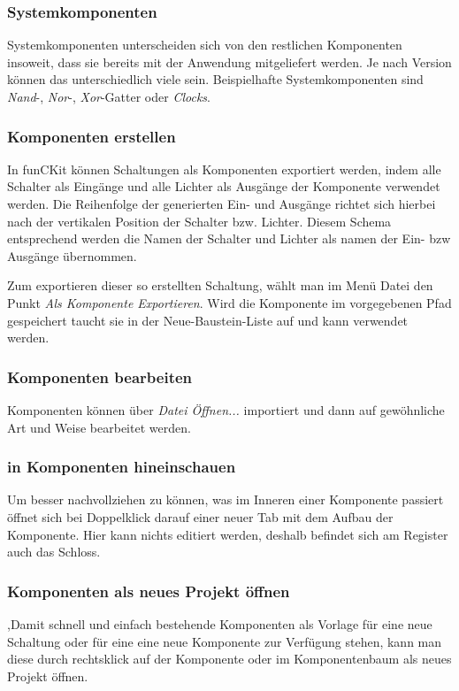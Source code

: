 \documentclass[12pt,a4paper]{scrartcl}
\newcommand{\projectName}{funCKit\xspace} %
\newcommand{\fckNewBrickList}{Neue-Baustein-Liste\xspace}
\begin{document}
\subsubsection{Systemkomponenten}
Systemkomponenten unterscheiden sich von den restlichen Komponenten insoweit, dass sie bereits mit der Anwendung mitgeliefert werden. Je nach Version können das unterschiedlich viele sein. Beispielhafte Systemkomponenten sind \textit{Nand}-, \textit{Nor}-, \textit{Xor}-Gatter oder \textit{Clocks}.

\subsubsection{Komponenten erstellen}
In \projectName können Schaltungen als Komponenten exportiert werden, indem alle Schalter als Eingänge und alle Lichter als Ausgänge der Komponente verwendet werden. Die Reihenfolge der generierten Ein- und Ausgänge richtet sich hierbei nach der vertikalen Position der Schalter bzw. Lichter. Diesem Schema entsprechend werden die Namen der Schalter und Lichter als namen der Ein- bzw Ausgänge übernommen.

Zum exportieren dieser so erstellten Schaltung, wählt man im Menü Datei den Punkt \textsl{Als Komponente Exportieren}. Wird die Komponente im vorgegebenen Pfad gespeichert taucht sie in der \fckNewBrickList auf und kann verwendet werden.

\subsubsection{Komponenten bearbeiten}
Komponenten können über \textsl{Datei \textrightarrow Öffnen...} importiert und dann auf gewöhnliche Art und Weise bearbeitet werden.

\subsubsection{in Komponenten hineinschauen}
Um besser nachvollziehen zu können, was im Inneren einer Komponente passiert öffnet sich bei Doppelklick darauf einer neuer Tab mit dem Aufbau der Komponente. Hier kann nichts editiert werden, deshalb befindet sich am Register auch das Schloss.

\subsubsection{Komponenten als neues Projekt öffnen}
,Damit schnell und einfach bestehende Komponenten als Vorlage für eine neue Schaltung oder für eine eine neue Komponente zur Verfügung stehen, kann man diese durch rechtsklick auf der Komponente oder im Komponentenbaum als neues Projekt öffnen.
\end{document}
